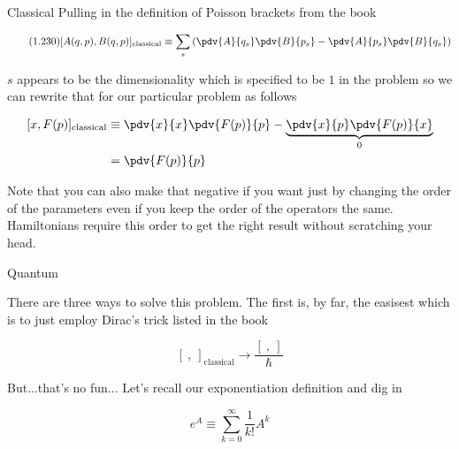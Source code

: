\begin{answer}

  \begin{answerpart}{Classical}
    Pulling in the definition of Poisson brackets from the book
    
    \begin{equation}
      \tag{1.230}
      [A(q,p),B(q,p)]_{\text{classical}} \equiv
      \sum_s \left(
      \pdv{A}{q_s}
      \pdv{B}{p_s}
      - 
      \pdv{A}{p_s}
      \pdv{B}{q_s}
      \right)
    \end{equation}

    $s$ appears to be the dimensionality which is specified to be $1$
    in the problem so we can rewrite that for our particular problem
    as follows

    \begin{equation}
      \begin{split}
        [x,F(p)]_{\text{classical}}
        &\equiv
        \pdv{x}{x}
        \pdv{F(p)}{p}
        - 
        \underbrace{
          \pdv{x}{p}
          \pdv{F(p)}{x}
          }_{0}
        \\
        &= \pdv{F(p)}{p}
      \end{split}
    \end{equation}

    Note that you can also make that negative if you want just by
    changing the order of the parameters even if you keep the order of
    the operators the same.  Hamiltonians require this order to get
    the right result without scratching your head.
  \end{answerpart}

  \begin{answerpart}{Quantum}

    There are three ways to solve this problem.  The first is, by far,
    the easisest which is to just employ Dirac's trick listed in the book

    \begin{equation}
      \tag{1.229}
      [\ ,\ ]_{\text{classical}} \rightarrow \frac{[\ ,\ ]}{\hbar}
    \end{equation}

    But...that's no fun...  Let's recall our exponentiation definition
    and dig in
 
    \begin{equation}
      e^{A} \equiv \sum_{k=0}^{\infty} \frac{1}{k!} A^k
    \end{equation}


\end{answerpart}
\end{answer}
